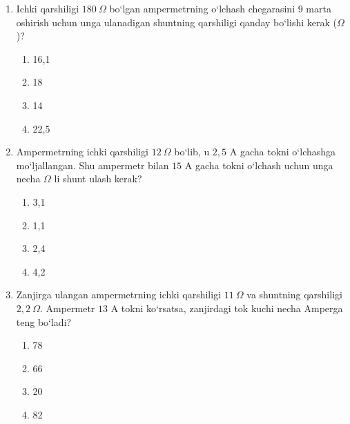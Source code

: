 \begin{enumerate}

\begin{enumerate}[label=\Alph*)]
\item 500
\item 120
\item 300
\item 200

\end{enumerate}

\item Ichki qarshiligi $180~\Omega$ bo‘lgan ampermetrning o‘lchash chegarasini $9$ marta oshirish uchun unga ulanadigan shuntning qarshiligi qanday bo‘lishi kerak ($\Omega$)?
\begin{enumerate}[label=\Alph*)]
\item 16,1
\item 18
\item 14
\item 22,5
\end{enumerate}

\item Ampermetrning ichki qarshiligi $12~\Omega$ bo‘lib, u $2,5$ A gacha tokni o‘lchashga mo‘ljallangan. Shu ampermetr bilan $15$ A gacha tokni o‘lchash uchun unga necha $\Omega$ li shunt ulash kerak?
\begin{enumerate}[label=\Alph*)]
\item 3,1
\item 1,1
\item 2,4
\item 4,2

\end{enumerate}

\item Zanjirga ulangan ampermetrning ichki qarshiligi $11~\Omega$ va shuntning qarshiligi $2,2~\Omega$. Ampermetr $13$ A tokni ko‘rsatsa, zanjirdagi tok kuchi necha Amperga teng bo‘ladi?
\begin{enumerate}[label=\Alph*)]
\item 78
\item 66
\item 20
\item 82
\end{enumerate}


\end{enumerate}
